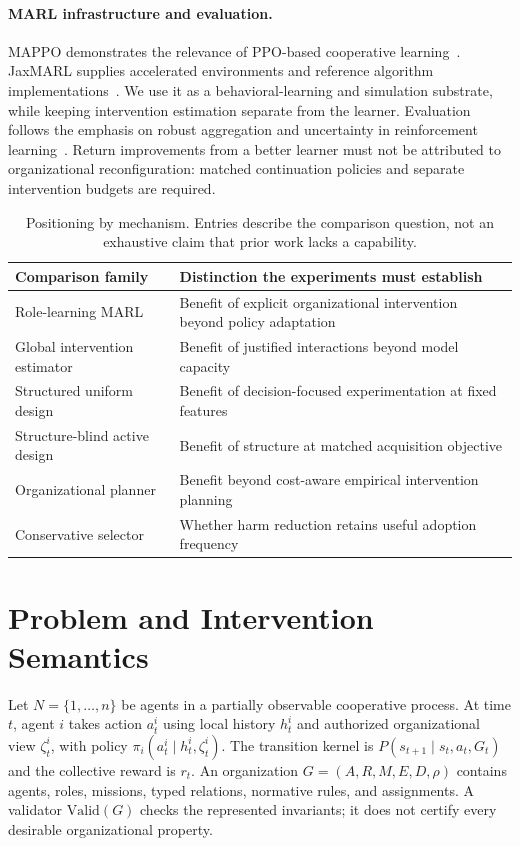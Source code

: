 \documentclass[runningheads]{llncs}
\begin{document}
\paragraph{MARL infrastructure and evaluation.}
MAPPO demonstrates the relevance of PPO-based cooperative learning~\cite{mappo}. JaxMARL supplies accelerated environments and reference algorithm implementations~\cite{jaxmarl}. We use it as a behavioral-learning and simulation substrate, while keeping intervention estimation separate from the learner. Evaluation follows the emphasis on robust aggregation and uncertainty in reinforcement learning~\cite{agarwal,gorsane}. Return improvements from a better learner must not be attributed to organizational reconfiguration: matched continuation policies and separate intervention budgets are required.

\begin{table}[t]
    \caption{Positioning by mechanism. Entries describe the comparison question, not an exhaustive claim that prior work lacks a capability.}\label{tab:position}
    \small\begin{tabularx}{\textwidth}{@{}lX@{}}\toprule
        Comparison family             & Distinction the experiments must establish                               \\\midrule
        Role-learning MARL            & Benefit of explicit organizational intervention beyond policy adaptation \\
        Global intervention estimator & Benefit of justified interactions beyond model capacity                  \\
        Structured uniform design     & Benefit of decision-focused experimentation at fixed features            \\
        Structure-blind active design & Benefit of structure at matched acquisition objective                    \\
        Organizational planner        & Benefit beyond cost-aware empirical intervention planning                \\
        Conservative selector         & Whether harm reduction retains useful adoption frequency                 \\\bottomrule
    \end{tabularx}\end{table}

\section{Problem and Intervention Semantics}\label{sec:problem}
Let $N=\{1,\ldots,n\}$ be agents in a partially observable cooperative process. At time $t$, agent $i$ takes action $a_t^i$ using local history $h_t^i$ and authorized organizational view $\zeta_t^i$, with policy $\pi_i(a_t^i\mid h_t^i,\zeta_t^i)$. The transition kernel is $P(s_{t+1}\mid s_t,a_t,G_t)$ and the collective reward is $r_t$. An organization $G=(A,R,M,E,D,\rho)$ contains agents, roles, missions, typed relations, normative rules, and assignments. A validator $\mathrm{Valid}(G)$ checks the represented invariants; it does not certify every desirable organizational property.
\end{document}
